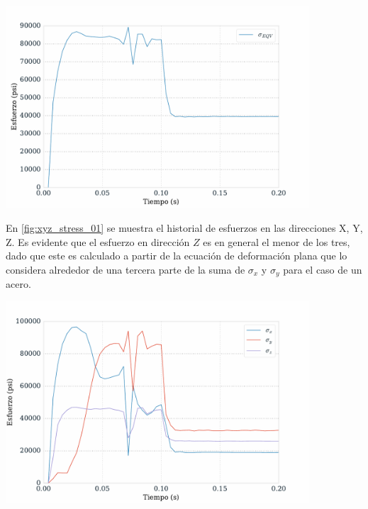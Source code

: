 \begin{center}
\includegraphics[width=0.85\textwidth]{src/ch4/von_mises_stress_01.pdf}
\label{fig:von_mises_stress_01}
\end{center}

En \ref{fig:xyz_stress_01} se muestra el historial de esfuerzos en las direcciones 
X, Y, Z. Es evidente que el esfuerzo en dirección $Z$ es en general el menor de 
los tres, dado que este es calculado a partir de la ecuación de deformación plana 
que lo considera alrededor de una tercera parte de la suma de $\sigma_x$ y $\sigma_y$ para 
el caso de un acero.

\begin{center}
\includegraphics[width=0.85\textwidth]{src/ch4/xyz_stress_01.pdf}
\label{fig:xyz_stress_01}
\end{center}

